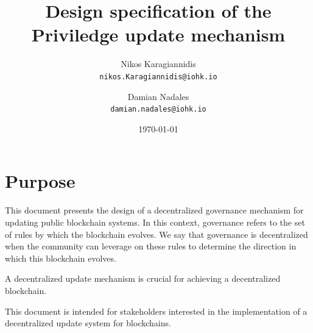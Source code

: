 \documentclass[11pt,a4paper]{article}
\begin{document}

\title{
  Design specification of the Priviledge update mechanism\\
}

\author{
  Nikos Karagiannidis\\
  {\small \texttt{nikos.Karagiannidis@iohk.io}}\\
  \and
  Damian Nadales \\
  {\small \texttt{damian.nadales@iohk.io}}\\
}

\date{\today}

\maketitle

\begin{abstract}

\end{abstract}

\tableofcontents
\listoffigures
\listoftables

\section{Purpose}
\label{sec:purpose}

This document presents the design of a decentralized governance mechanism for
updating public blockchain systems.
In this context, governance refers to the set of rules by which the blockchain
evolves.
We say that governance is decentralized when the community can leverage on these
rules to determine the direction in which this blockchain evolves.


A decentralized update mechanism is crucial for achieving a decentralized
blockchain.

This document is intended for stakeholders interested in the implementation of a
decentralized update system for blockchains.
\end{document}
